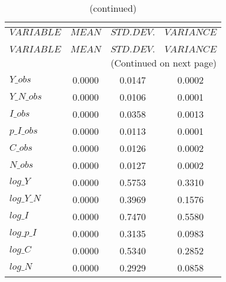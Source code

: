  
\begin{center}
\begin{longtable}{lccc} 
\caption{THEORETICAL MOMENTS}\\
 \label{Table:th_moments}\\
\toprule 
$VARIABLE   $	 & 	 $         MEAN$	 & 	 $    STD. DEV.$	 & 	 $     VARIANCE$\\
\midrule \endfirsthead 
\caption{(continued)}\\
 \toprule \\ 
$VARIABLE   $	 & 	 $         MEAN$	 & 	 $    STD. DEV.$	 & 	 $     VARIANCE$\\
\midrule \endhead 
\midrule \multicolumn{4}{r}{(Continued on next page)} \\ \bottomrule \endfoot 
\bottomrule \endlastfoot 
$Y\_obs     $	 & 	       0.0000	 & 	       0.0147	 & 	       0.0002 \\ 
$Y\_N\_obs  $	 & 	       0.0000	 & 	       0.0106	 & 	       0.0001 \\ 
$I\_obs     $	 & 	       0.0000	 & 	       0.0358	 & 	       0.0013 \\ 
$p\_I\_obs  $	 & 	       0.0000	 & 	       0.0113	 & 	       0.0001 \\ 
$C\_obs     $	 & 	       0.0000	 & 	       0.0126	 & 	       0.0002 \\ 
$N\_obs     $	 & 	       0.0000	 & 	       0.0127	 & 	       0.0002 \\ 
$log\_Y     $	 & 	       0.0000	 & 	       0.5753	 & 	       0.3310 \\ 
$log\_Y\_N  $	 & 	       0.0000	 & 	       0.3969	 & 	       0.1576 \\ 
$log\_I     $	 & 	       0.0000	 & 	       0.7470	 & 	       0.5580 \\ 
$log\_p\_I  $	 & 	       0.0000	 & 	       0.3135	 & 	       0.0983 \\ 
$log\_C     $	 & 	       0.0000	 & 	       0.5340	 & 	       0.2852 \\ 
$log\_N     $	 & 	       0.0000	 & 	       0.2929	 & 	       0.0858 \\ 
\end{longtable}
 \end{center}
